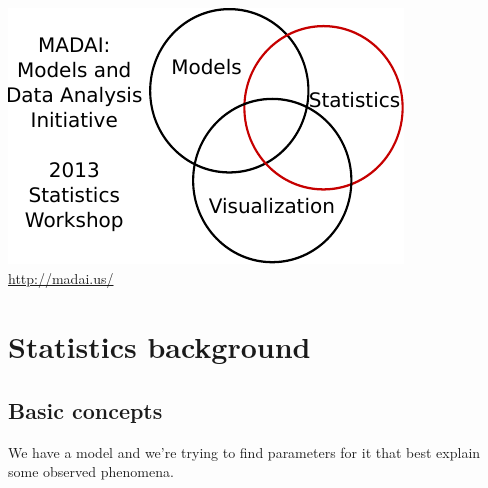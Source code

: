 \documentclass{article}
\begin{document}
\begin{center}
\includegraphics{figures/MADAI_2013_Stats_Workshop.pdf}\\
\url{http://madai.us/}
\end{center}

\section{Statistics background}

\subsection{Basic concepts}

We have a model and we're trying to find parameters for it that best
explain some observed phenomena.
\end{document}

